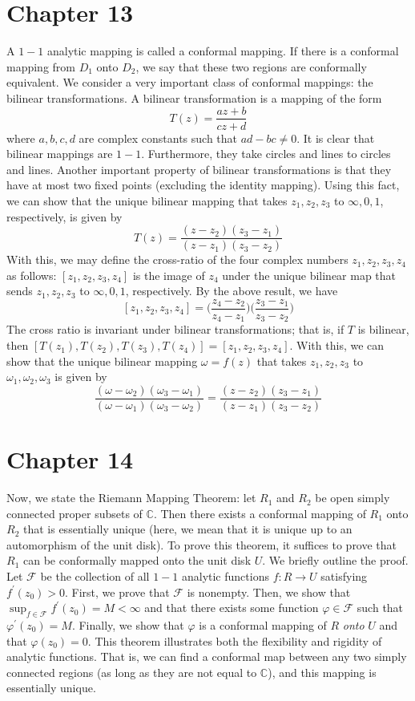 \documentclass[12pt]{article}
\newcommand{\cc}{{\mathbb C}}
\begin{document}
\section*{Chapter 13}
A $1-1$ analytic mapping is called a conformal mapping. If there is a conformal mapping from $D_1$ onto $D_2$, we say that these two regions are conformally equivalent. We consider a very important class of conformal mappings: the bilinear transformations. A bilinear transformation is a mapping of the form
\[
T(z) = \frac{az+b}{cz+d}
\] where $a,b,c,d$ are complex constants such that $ad - bc \neq 0$. It is clear that bilinear mappings are $1-1$. Furthermore, they take circles and lines to circles and lines. Another important property of bilinear transformations is that they have at most two fixed points (excluding the identity mapping). Using this fact, we can show that the unique bilinear mapping that takes $z_1,z_2,z_3$ to $\infty, 0, 1$, respectively, is given by
\[
T(z) = \frac{(z-z_2)(z_3-z_1)}{(z-z_1)(z_3-z_2)}
\] With this, we may define the cross-ratio of the four complex numbers $z_1,z_2,z_3,z_4$ as follows: $[z_1,z_2,z_3,z_4]$ is the image of $z_4$ under the unique bilinear map that sends $z_1,z_2,z_3$ to $\infty, 0, 1$, respectively. By the above result, we have
\[
[z_1,z_2,z_3,z_4] = \bigg(\frac{z_4-z_2}{z_4 - z_1}\bigg)\bigg(\frac{z_3-z_1}{z_3-z_2}\bigg)
\] The cross ratio is invariant under bilinear transformations; that is, if $T$ is bilinear, then $[T(z_1),T(z_2),T(z_3),T(z_4)] = [z_1,z_2,z_3,z_4]$. With this, we can show that the unique bilinear mapping $\omega = f(z)$ that takes $z_1, z_2, z_3$ to $\omega_1,\omega_2,\omega_3$ is given by
\[
\frac{(\omega-\omega_2)(\omega_3-\omega_1)}{(\omega-\omega_1)(\omega_3-\omega_2)} = \frac{(z-z_2)(z_3 - z_1)}{(z-z_1)(z_3-z_2)}
\]
\section*{Chapter 14}
Now, we state the Riemann Mapping Theorem: let $R_1$ and $R_2$ be open simply connected proper subsets of $\cc$. Then there exists a conformal mapping of $R_1$ onto $R_2$ that is essentially unique (here, we mean that it is unique up to an automorphism of the unit disk). To prove this theorem, it suffices to prove that $R_1$ can be conformally mapped onto the unit disk $U$. We briefly outline the proof. Let $\mathscr{F}$ be the collection of all $1-1$ analytic functions $f: R \rightarrow U$ satisfying $f^\prime(z_0) > 0$. First, we prove that $\mathscr{F}$ is nonempty. Then, we show that $\sup_{f \in \mathscr{F}} f^\prime(z_0) = M < \infty$ and that there exists some function $\varphi \in \mathscr{F}$ such that $\varphi^\prime(z_0) = M$. Finally, we show that $\varphi$ is a conformal mapping of $R$ \emph{onto} $U$ and that $\varphi(z_0) = 0$. This theorem illustrates both the flexibility and rigidity of analytic functions. That is, we can find a conformal map between any two simply connected regions (as long as they are not equal to $\cc$), and this mapping is essentially unique.
\end{document}
